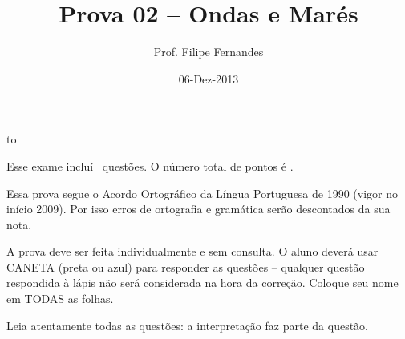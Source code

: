 \documentclass[letterpaper,portuguese,12pt,pdftex]{exam}
\title{Prova 02 -- Ondas e Marés}
\author{Prof. Filipe Fernandes}
\date{06-Dez-2013}
\begin{document}
\maketitle
\doublespacing

\vspace{2cm}
\hbox to \textwidth{Nome e número de matrícula:\enspace\hrulefill}
\vspace{2cm}

\begin{minipage}{.8\textwidth}
Esse exame incluí \numquestions\ questões. O número total de pontos é \numpoints.
\vspace{1cm}

Essa prova segue o Acordo Ortográfico da Língua Portuguesa de 1990 (vigor no
início 2009).  Por isso erros de ortografia e gramática serão descontados da sua
nota.

A prova deve ser feita individualmente e sem consulta.  O aluno deverá usar
CANETA (preta ou azul) para responder as questões – qualquer questão respondida
à lápis não será considerada na hora da correção.  Coloque seu nome em TODAS as
folhas.

\vspace{1cm}

Leia atentamente todas as questões: a interpretação faz parte da questão.

\end{minipage}
\end{document}
